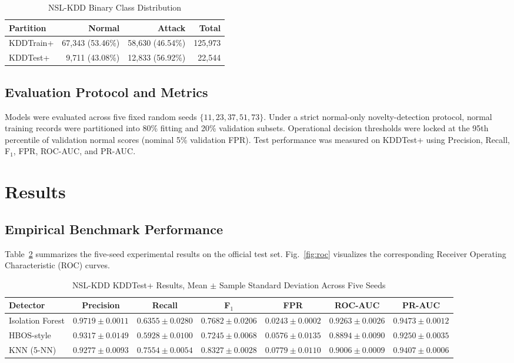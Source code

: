 \documentclass[conference]{IEEEtran}
\begin{document}
\begin{table}[t]
\centering
\caption{NSL-KDD Binary Class Distribution}
\label{tab:dataset}
\footnotesize
\begin{tabular}{lrrr}
\toprule
\textbf{Partition} & \textbf{Normal} & \textbf{Attack} & \textbf{Total}\\
\midrule
KDDTrain+ & 67,343 (53.46\%) & 58,630 (46.54\%) & 125,973\\
KDDTest+ & 9,711 (43.08\%) & 12,833 (56.92\%) & 22,544\\
\bottomrule
\end{tabular}
\end{table}

\subsection{Evaluation Protocol and Metrics}
Models were evaluated across five fixed random seeds $\{11, 23, 37, 51, 73\}$. Under a strict normal-only novelty-detection protocol, normal training records were partitioned into 80\% fitting and 20\% validation subsets. Operational decision thresholds were locked at the 95th percentile of validation normal scores (nominal 5\% validation FPR). Test performance was measured on KDDTest+ using Precision, Recall, F$_1$, FPR, ROC-AUC, and PR-AUC.

\section{Results}
\subsection{Empirical Benchmark Performance}
Table~\ref{tab:results} summarizes the five-seed experimental results on the official test set. Fig.~\ref{fig:roc} visualizes the corresponding Receiver Operating Characteristic (ROC) curves.

\begin{table}[t]
\centering
\caption{NSL-KDD KDDTest+ Results, Mean $\pm$ Sample Standard Deviation Across Five Seeds}
\label{tab:results}
\scriptsize
\begin{tabular}{lcccccc}
\toprule
\textbf{Detector} & \textbf{Precision} & \textbf{Recall} & \textbf{F$_1$} & \textbf{FPR} & \textbf{ROC-AUC} & \textbf{PR-AUC}\\
\midrule
Isolation Forest & $0.9719\pm0.0011$ & $0.6355\pm0.0280$ & $0.7682\pm0.0206$ & $0.0243\pm0.0002$ & $0.9263\pm0.0026$ & $0.9473\pm0.0012$\\
HBOS-style & $0.9317\pm0.0149$ & $0.5928\pm0.0100$ & $0.7245\pm0.0068$ & $0.0576\pm0.0135$ & $0.8894\pm0.0090$ & $0.9250\pm0.0035$\\
KNN (5-NN) & $0.9277\pm0.0093$ & $0.7554\pm0.0054$ & $0.8327\pm0.0028$ & $0.0779\pm0.0110$ & $0.9006\pm0.0009$ & $0.9407\pm0.0006$\\
\bottomrule
\end{tabular}
\end{table}
\end{document}
